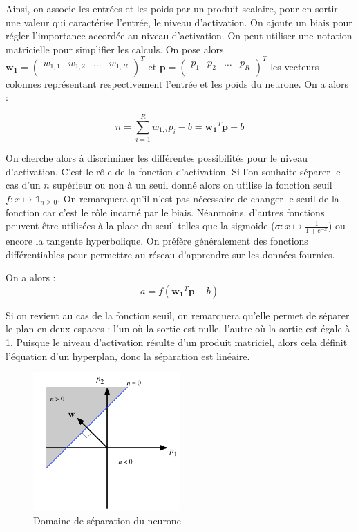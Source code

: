 Ainsi, on associe les entrées et les poids par un produit scalaire, pour en sortir une valeur qui caractérise l'entrée, le niveau d'activation.
On ajoute un biais pour régler l'importance accordée au niveau d'activation. On peut utiliser une notation matricielle pour simplifier les calculs.
On pose alors $\mathbf{w_1} = 
\begin{pmatrix}
  w_{1,1} & w_{1,2} & \ldots & w_{1,R}\\
\end{pmatrix}^T $ 
et
$ \mathbf{p} = 
\begin{pmatrix}
 p_1 & p_2 & \ldots & p_R \\
\end{pmatrix}^T $ 
les vecteurs colonnes représentant respectivement l'entrée et les poids du neurone. On a alors :

\begin{equation} 
n = \sum_{i=1}^{R} w_{1,i} p_i - b = \mathbf{w_1}^T \mathbf{p} - b
\end{equation}

On cherche alors à discriminer les différentes possibilités pour le niveau d'activation. C'est le rôle de la fonction d'activation. Si l'on souhaite séparer
le cas d'un $n$ supérieur ou non à un seuil donné alors on utilise la fonction seuil $ f : x \mapsto \mathds{1}_{n \geq 0} $. On remarquera qu'il n'est 
pas nécessaire de changer le seuil de la fonction car c'est le rôle incarné par le biais. Néanmoins, d'autres fonctions peuvent être utilisées à la place
du seuil telles que la sigmoide ($\sigma : x \mapsto \frac{1}{1+e^{-x}}$) ou encore la tangente hyperbolique. 
On préfère généralement des fonctions différentiables pour permettre au réseau d'apprendre sur les données fournies.

On a alors : 
\begin{equation}
 a = f(\mathbf{w_1}^T \mathbf{p} - b)
\end{equation}

Si on revient au cas de la fonction seuil, on remarquera qu'elle permet de séparer le plan en deux espaces : l'un où la sortie est nulle, l'autre où
la sortie est égale à 1. Puisque le niveau d'activation résulte d'un produit matriciel, alors cela définit l'équation d'un hyperplan, donc la séparation
est linéaire.

\begin{figure}[h]
 \centering
 \includegraphics[width=0.5\textwidth]{img/separation_lineaire_du_plan.png}
 \caption{Domaine de séparation du neurone}
\end{figure}

